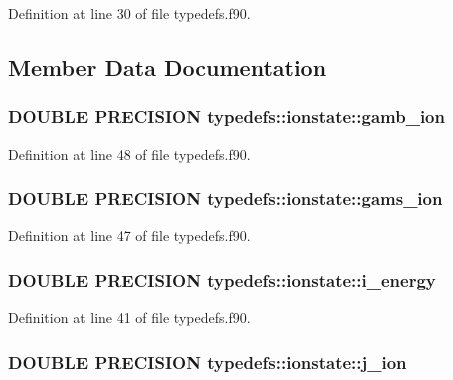 Definition at line 30 of file typedefs.f90.

\subsection{Member Data Documentation}
\hypertarget{typetypedefs_1_1ionstate_a6b061c6fbe4f2c7e5b16f8c09b173fd9}{
\subsubsection[{gamb\_\-ion}]{\setlength{\rightskip}{0pt plus 5cm}DOUBLE PRECISION {\bf typedefs::ionstate::gamb\_\-ion}}}
\label{typetypedefs_1_1ionstate_a6b061c6fbe4f2c7e5b16f8c09b173fd9}


Definition at line 48 of file typedefs.f90.\hypertarget{typetypedefs_1_1ionstate_a8f8dbe19856ab70a19c441905ee7b18d}{
\subsubsection[{gams\_\-ion}]{\setlength{\rightskip}{0pt plus 5cm}DOUBLE PRECISION {\bf typedefs::ionstate::gams\_\-ion}}}
\label{typetypedefs_1_1ionstate_a8f8dbe19856ab70a19c441905ee7b18d}


Definition at line 47 of file typedefs.f90.\hypertarget{typetypedefs_1_1ionstate_a170725c1bc6725e3f8704244cf96f166}{
\subsubsection[{i\_\-energy}]{\setlength{\rightskip}{0pt plus 5cm}DOUBLE PRECISION {\bf typedefs::ionstate::i\_\-energy}}}
\label{typetypedefs_1_1ionstate_a170725c1bc6725e3f8704244cf96f166}


Definition at line 41 of file typedefs.f90.\hypertarget{typetypedefs_1_1ionstate_acef241a8b7001c25ee9612dba4b5cc76}{
\subsubsection[{j\_\-ion}]{\setlength{\rightskip}{0pt plus 5cm}DOUBLE PRECISION {\bf typedefs::ionstate::j\_\-ion}}}
\label{typetypedefs_1_1ionstate_acef241a8b7001c25ee9612dba4b5cc76}


